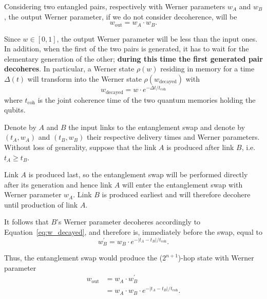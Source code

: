\documentclass{masterthesis}
\begin{document}
Considering two entangled pairs, respectively with Werner parameters $w_A$ and $w_B$, the output Werner parameter, if we do not consider decoherence, will be %
\begin{equation}
    w_\text{out} = w_A \cdot w_B .
\end{equation}

Since $w \in [0, 1]$, the output Werner parameter will be less than the input ones.
In addition, when the first of the two pairs is generated, it has to wait for the elementary generation of the other; \textbf{during this time the first generated pair decoheres}. In particular, a Werner state $\rho(w)$ residing in memory for a time $\Delta(t)$ will transform into the Werner state $\rho(w_{\text{decayed}})$ with 
\begin{equation}\label{eq:w_decayed}
    w_{\text{decayed}} = w \cdot e^{-\Delta t / t_\text{coh}}
\end{equation}
where $t_\text{coh}$ is the joint coherence time of the two quantum memories holding the qubits. %

Denote by $A$ and $B$ the input links to the entanglement swap and denote by $\left(t_{A}, w_{A}\right)$ and $\left(t_{B}, w_{B}\right)$ their respective delivery times and Werner parameters. 
Without loss of generality, suppose that the link $A$ is produced after link $B$, i.e.\ $t_{A} \geq t_{B}$. 

Link $A$ is produced last, so the entanglement swap will be performed directly after its generation and hence link $A$ will enter the entanglement swap with Werner parameter $w_{A}$. Link $B$ is produced earliest and will therefore decohere until production of link $A$.

It follows that $B$'s Werner parameter decoheres accordingly to Equation~\ref{eq:w_decayed}, and therefore is, immediately before the swap, equal to
\begin{equation*}
    w_{B}^{\prime} = w_{B} \cdot e^{-\left|t_{A}-t_{B}\right| / t_\text{coh}} .
\end{equation*}

Thus, the entanglement swap would produce the ($2^{n+1}$)-hop state with Werner parameter
\begin{align}
    w_\text{out} &= w_{A} \cdot w_{B}^{\prime} \nonumber \\
                 &= w_{A} \cdot w_{B} \cdot e^{-\left|t_{A}-t_{B}\right| / t_\text{coh}} .
\end{align}
\end{document}
